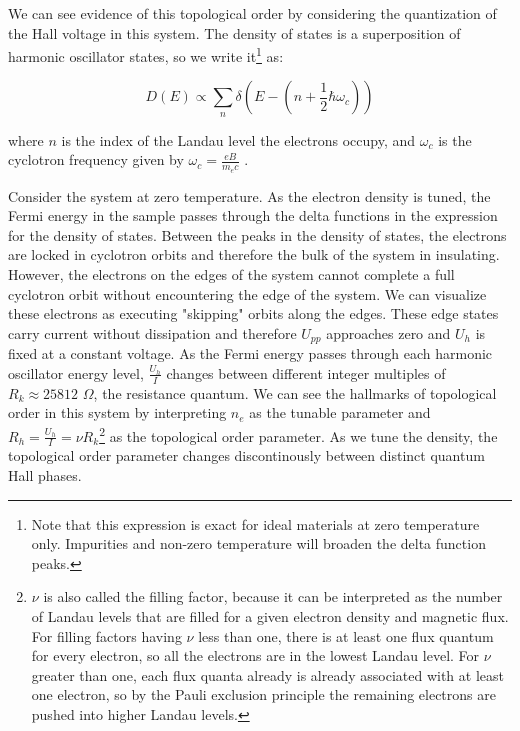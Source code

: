 We can see evidence of this topological order by considering the quantization of the Hall voltage in this system. The density of states is a superposition of harmonic oscillator states, so we write it\footnote{Note that this expression is exact for ideal materials at zero temperature only. Impurities and non-zero temperature will broaden the delta function peaks.} as:

\begin{equation}
D(E) \propto \sum_{n} \delta \left(E - \left(n + \frac{1}{2} \hbar \omega_{c} \right) \right)
\end{equation}

where $n$ is the index of the Landau level the electrons occupy, and $\omega_{c}$ is the cyclotron frequency given by $\omega_{c} = \frac{eB}{m_{e} c}$ \cite{Chakraborty1995}.

Consider the system at zero temperature. As the electron density is tuned, the Fermi energy in the sample passes through the delta functions in the expression for the density of states. Between the peaks in the density of states, the electrons are locked in cyclotron orbits and therefore the bulk of the system in insulating. However, the electrons on the edges of the system cannot complete a full cyclotron orbit without encountering the edge of the system. We can visualize these electrons as executing "skipping" orbits along the edges. These edge states carry current without dissipation and therefore $U_{pp}$ approaches zero and $U_{h}$ is fixed at a constant voltage. As the Fermi energy passes through each harmonic oscillator energy level, $\frac{U_{h}}{I}$ changes between different integer multiples of $R_{k} \approx 25812$ $\Omega$, the resistance quantum. We can see the hallmarks of topological order in this system by interpreting $n_{e}$ as the tunable parameter and $R_{h} = \frac{U_{h}}{I} = \nu R_{k}$\footnote{$\nu$ is also called the filling factor, because it can be interpreted as the number of Landau levels that are filled for a given electron density and magnetic flux. For filling factors having $\nu$ less than one, there is at least one flux quantum for every electron, so all the electrons are in the lowest Landau level. For $\nu$ greater than one, each flux quanta already is already associated with at least one electron, so by the Pauli exclusion principle the remaining electrons are pushed into higher Landau levels.} as the topological order parameter. As we tune the density, the topological order parameter changes discontinously between distinct quantum Hall phases.

